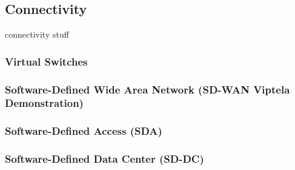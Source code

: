 \subsection{Connectivity}
connectivity stuff

\subsubsection{Virtual Switches}
\subsubsection{Software-Defined Wide Area Network (SD-WAN Viptela Demonstration)}
\subsubsection{Software-Defined Access (SDA)}
\subsubsection{Software-Defined Data Center (SD-DC)}
